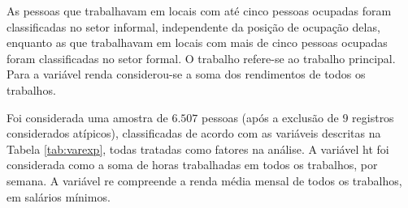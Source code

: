 \documentclass[]{book}
\theoremstyle{definition}
\theoremstyle{definition}
\theoremstyle{definition}
\theoremstyle{remark}
\begin{document}
As pessoas que trabalhavam em locais com até cinco pessoas ocupadas
foram classificadas no setor informal, independente da posição de
ocupação delas, enquanto as que trabalhavam em locais com mais de cinco
pessoas ocupadas foram classificadas no setor formal. O trabalho
refere-se ao trabalho principal. Para a variável renda considerou-se a
soma dos rendimentos de todos os trabalhos.

Foi considerada uma amostra de \(6.507\) pessoas (após a exclusão de
\(9\) registros considerados atípicos), classificadas de acordo com as
variáveis descritas na Tabela \ref{tab:varexp}, todas tratadas como
fatores na análise. A variável ht foi considerada como a soma de horas
trabalhadas em todos os trabalhos, por semana. A variável re compreende
a renda média mensal de todos os trabalhos, em salários mínimos.
\end{document}
